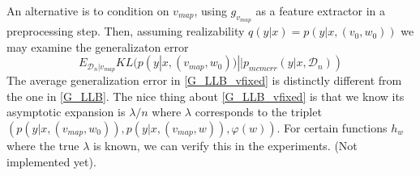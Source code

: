 \documentclass{article} %
\begin{document}
An alternative is to condition on $v_{map}$, using $g_{v_{map}}$ as a feature extractor in a preprocessing step. Then, assuming realizability $q(y|x) = p(y|x,(v_0,w_0))$ we may examine the generalizaton error
\begin{equation}
E_{\mathcal D_n | v_{map}} KL( p(y|x,(v_{map},w_0)) || p_{mcmcrr}(y|x, \mathcal D_n) )
\label{G_LLB_vfixed}
\end{equation}
The average generalization error in \eqref{G_LLB_vfixed} is distinctly different from the one in \eqref{G_LLB}. The nice thing about \eqref{G_LLB_vfixed} is that we know its asymptotic expansion is $\lambda/n$ where $\lambda$ corresponds to the triplet $( p(y|x,(v_{map},w_0)), p(y| x, (v_{map},w)), \varphi(w))$. For certain functions $h_w$ where the true $\lambda$ is known, we can verify this in the experiments. (Not implemented yet).
\end{document}
